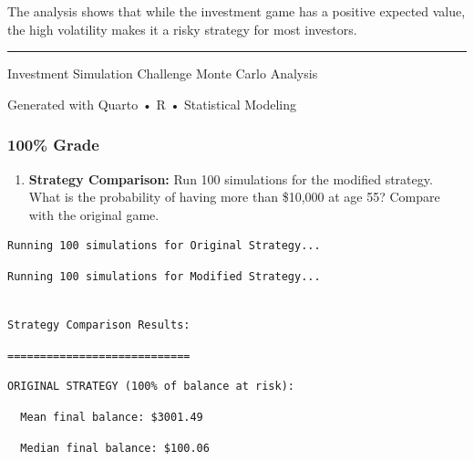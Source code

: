 \documentclass[
  letterpaper,
  DIV=11,
  numbers=noendperiod]{scrartcl}
\providecommand{\tightlist}{%
  \setlength{\itemsep}{0pt}\setlength{\parskip}{0pt}}
\begin{document}
The analysis shows that while the investment game has a positive
expected value, the high volatility makes it a risky strategy for most
investors.

\begin{center}\rule{0.5\linewidth}{0.5pt}\end{center}

Investment Simulation Challenge \textbar{} Monte Carlo Analysis

Generated with Quarto • R • Statistical Modeling

\subsubsection{100\% Grade}\label{grade-3}

\begin{enumerate}
\def\labelenumi{\arabic{enumi}.}
\setcounter{enumi}{5}
\tightlist
\item
  \textbf{Strategy Comparison:} Run 100 simulations for the modified
  strategy. What is the probability of having more than \$10,000 at age
  55? Compare with the original game.
\end{enumerate}

\begin{verbatim}
Running 100 simulations for Original Strategy...
\end{verbatim}

\begin{verbatim}
Running 100 simulations for Modified Strategy...
\end{verbatim}

\begin{verbatim}

Strategy Comparison Results:
\end{verbatim}

\begin{verbatim}
============================
\end{verbatim}

\begin{verbatim}
ORIGINAL STRATEGY (100% of balance at risk):
\end{verbatim}

\begin{verbatim}
  Mean final balance: $3001.49
\end{verbatim}

\begin{verbatim}
  Median final balance: $100.06
\end{verbatim}
\end{document}
